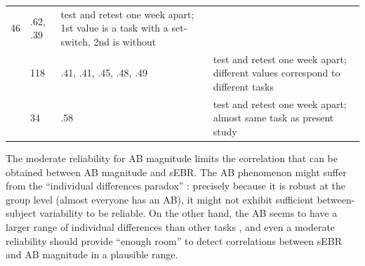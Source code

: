 \documentclass[11pt,english,]{memoir}
\begin{document}
\begin{longtable}[]{@{}llll@{}}
\begin{minipage}[t]{0.03\columnwidth}
46\strut
\end{minipage} & \begin{minipage}[t]{0.15\columnwidth}\raggedright
.62, .39\strut
\end{minipage} & \begin{minipage}[t]{0.51\columnwidth}\raggedright
test and retest one week apart; 1st value is a task with a set-switch, 2nd is without\strut
\end{minipage}\tabularnewline
\begin{minipage}[t]{0.19\columnwidth}\raggedright
\textcite{Dale2013}\strut
\end{minipage} & \begin{minipage}[t]{0.03\columnwidth}\raggedright
118\strut
\end{minipage} & \begin{minipage}[t]{0.15\columnwidth}\raggedright
.41, .41, .45, .48, .49\strut
\end{minipage} & \begin{minipage}[t]{0.51\columnwidth}\raggedright
test and retest one week apart; different values correspond to different tasks\strut
\end{minipage}\tabularnewline
\begin{minipage}[t]{0.19\columnwidth}\raggedright
\textcite{London2015}\strut
\end{minipage} & \begin{minipage}[t]{0.03\columnwidth}\raggedright
34\strut
\end{minipage} & \begin{minipage}[t]{0.15\columnwidth}\raggedright
.58\strut
\end{minipage} & \begin{minipage}[t]{0.51\columnwidth}\raggedright
test and retest one week apart; almost same task as present study\strut
\end{minipage}\tabularnewline
\bottomrule
\end{longtable}

\endgroup

The moderate reliability for AB magnitude limits the correlation that can be obtained between AB magnitude and sEBR. The AB phenomenon might suffer from the ``individual differences paradox'' \autocite{Hedge2018}: precisely because it is robust at the group level (almost everyone has an AB), it might not exhibit sufficient between-subject variability to be reliable. On the other hand, the AB seems to have a larger range of individual differences than other tasks \autocite{Willems2016}, and even a moderate reliability should provide ``enough room'' to detect correlations between sEBR and AB magnitude in a plausible range.
\end{document}
